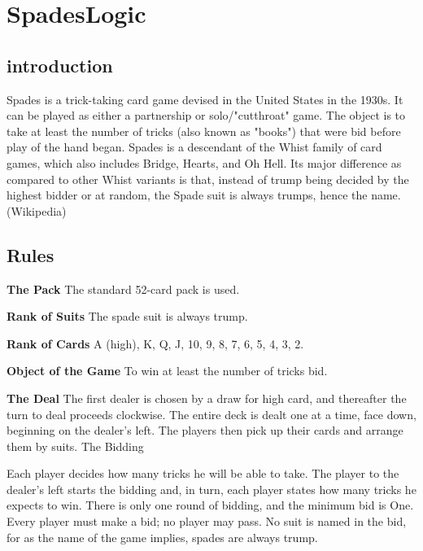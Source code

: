 \section{SpadesLogic}


\subsection{introduction}
	Spades is a trick-taking card game devised in the United States in the 1930s. It can be played as either a partnership or solo/"cutthroat" game. The object is to take at least the number of tricks (also known as "books") that were bid before play of the hand began. Spades is a descendant of the Whist family of card games, which also includes Bridge, Hearts, and Oh Hell. Its major difference as compared to other Whist variants is that, instead of trump being decided by the highest bidder or at random, the Spade suit is always trumps, hence the name. (Wikipedia)

\subsection{Rules}
	
\textbf{The Pack} \newline
The standard 52-card pack is used.\newline

\textbf{Rank of Suits} \newline
The spade suit is always trump.\newline

\textbf{Rank of Cards}\newline
A (high), K, Q, J, 10, 9, 8, 7, 6, 5, 4, 3, 2.\newline

\textbf{Object of the Game}\newline
To win at least the number of tricks bid.\newline

\textbf{The Deal} \newline
The first dealer is chosen by a draw for high card, and thereafter the turn to deal proceeds clockwise. The entire deck is dealt one at a time, face down, beginning on the dealer's left. The players then pick up their cards and arrange them by suits.
The Bidding

Each player decides how many tricks he will be able to take. The player to the dealer's left starts the bidding and, in turn, each player states how many tricks he expects to win. There is only one round of bidding, and the minimum bid is One. Every player must make a bid; no player may pass. No suit is named in the bid, for as the name of the game implies, spades are always trump.\newline


